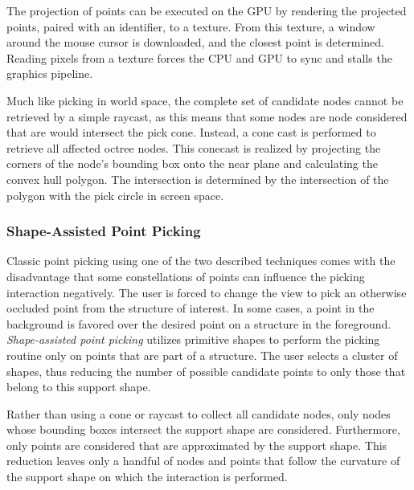 \par

The projection of points can be executed on the GPU by rendering the projected points, paired with an identifier, to a texture. From this texture, a window around the mouse cursor is downloaded, and the closest point is determined. Reading pixels from a texture forces the CPU and GPU to sync and stalls the graphics pipeline. 

\par

Much like picking in world space, the complete set of candidate nodes cannot be retrieved by a simple raycast, as this means that some nodes are node considered that are would intersect the pick cone. Instead, a cone cast is performed to retrieve all affected octree nodes. This conecast is realized by projecting the corners of the node's bounding box onto the near plane and calculating the convex hull polygon. The intersection is determined by the intersection of the polygon with the pick circle in screen space. 


\subsubsection{Shape-Assisted Point Picking}
\label {sec:picking_assisted}

Classic point picking using one of the two described techniques comes with the disadvantage that some constellations of points can influence the picking interaction negatively. The user is forced to change the view to pick an otherwise occluded point from the structure of interest. In some cases, a point in the background is favored over the desired point on a structure in the foreground. \textit{Shape-assisted point picking} utilizes primitive shapes to perform the picking routine only on points that are part of a structure. The user selects a cluster of shapes, thus reducing the number of possible candidate points to only those that belong to this support shape. 

\par

Rather than using a cone or raycast to collect all candidate nodes, only nodes whose bounding boxes intersect the support shape are considered. Furthermore, only points are considered that are approximated by the support shape. This reduction leaves only a handful of nodes and points that follow the curvature of the support shape on which the interaction is performed. 

